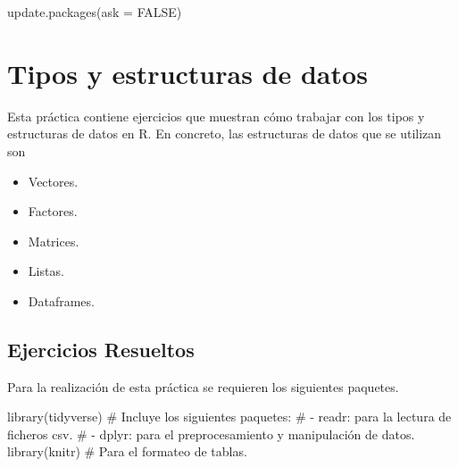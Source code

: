 \documentclass[
  spanish,
  a4paper,
]{scrreport}
\newenvironment{Shaded}{\begin{snugshade}}{\end{snugshade}}
\newcommand{\AttributeTok}[1]{\textcolor[rgb]{0.40,0.45,0.13}{#1}}
\newcommand{\CommentTok}[1]{\textcolor[rgb]{0.37,0.37,0.37}{#1}}
\newcommand{\ConstantTok}[1]{\textcolor[rgb]{0.56,0.35,0.01}{#1}}
\newcommand{\FunctionTok}[1]{\textcolor[rgb]{0.28,0.35,0.67}{#1}}
\newcommand{\NormalTok}[1]{\textcolor[rgb]{0.00,0.23,0.31}{#1}}
\providecommand{\tightlist}{%
  \setlength{\itemsep}{0pt}\setlength{\parskip}{0pt}}
\theoremstyle{definition}
\theoremstyle{remark}
\begin{document}
\begin{Shaded}
\begin{Highlighting}[]
\FunctionTok{update.packages}\NormalTok{(}\AttributeTok{ask =} \ConstantTok{FALSE}\NormalTok{)}
\end{Highlighting}
\end{Shaded}


\chapter{Tipos y estructuras de
datos}\label{tipos-y-estructuras-de-datos}

Esta práctica contiene ejercicios que muestran cómo trabajar con los
tipos y estructuras de datos en R. En concreto, las estructuras de datos
que se utilizan son

\begin{itemize}
\tightlist
\item
  Vectores.
\item
  Factores.
\item
  Matrices.
\item
  Listas.
\item
  Dataframes.
\end{itemize}

\section{Ejercicios Resueltos}\label{ejercicios-resueltos}

Para la realización de esta práctica se requieren los siguientes
paquetes.

\begin{Shaded}
\begin{Highlighting}[]
\FunctionTok{library}\NormalTok{(tidyverse) }
\CommentTok{\# Incluye los siguientes paquetes:}
\CommentTok{\# {-} readr: para la lectura de ficheros csv. }
\CommentTok{\# {-} dplyr: para el preprocesamiento y manipulación de datos.}
\FunctionTok{library}\NormalTok{(knitr) }\CommentTok{\# Para el formateo de tablas.}
\end{Highlighting}
\end{Shaded}
\end{document}
